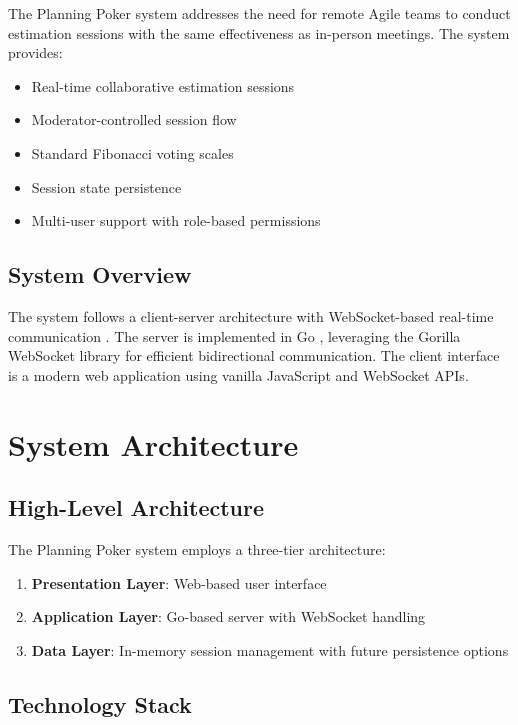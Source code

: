 \documentclass[11pt,a4paper]{article}
\begin{document}
The Planning Poker system addresses the need for remote Agile teams to conduct estimation sessions with the same effectiveness as in-person meetings. The system provides:

\begin{itemize}
    \item Real-time collaborative estimation sessions
    \item Moderator-controlled session flow
    \item Standard Fibonacci voting scales
    \item Session state persistence
    \item Multi-user support with role-based permissions
\end{itemize}

\subsection{System Overview}

The system follows a client-server architecture with WebSocket-based real-time communication \cite{rfc6455}. The server is implemented in Go \cite{golang2024}, leveraging the Gorilla WebSocket library \cite{gorilla2024} for efficient bidirectional communication. The client interface is a modern web application using vanilla JavaScript and WebSocket APIs.

\section{System Architecture}

\subsection{High-Level Architecture}

The Planning Poker system employs a three-tier architecture:

\begin{enumerate}
    \item \textbf{Presentation Layer}: Web-based user interface
    \item \textbf{Application Layer}: Go-based server with WebSocket handling
    \item \textbf{Data Layer}: In-memory session management with future persistence options
\end{enumerate}

\subsection{Technology Stack}
\end{document}
